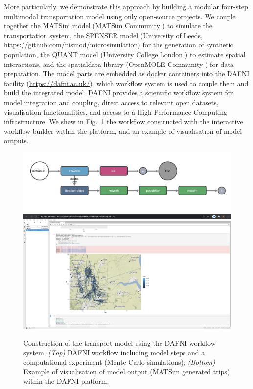 \documentclass[3p,times,procedia]{elsarticle}
\begin{document}
More particularly, we demonstrate this approach by building a modular four-step multimodal transportation model using only open-source projects. We couple together the MATSim model (MATSim Community \citep{horni2016multi}) to simulate the transportation system, the SPENSER model (University of Leeds, \url{https://github.com/nismod/microsimulation}) for the generation of synthetic population, the QUANT model (University College London \citep{milton2019accelerating}) to estimate spatial interactions, and the spatialdata library (OpenMOLE Community \citep{raimbault2020scala}) for data preparation. The model parts are embedded as docker containers into the DAFNI facility (\url{https://dafni.ac.uk/}), which workflow system is used to couple them and build the integrated model. DAFNI provides a scientific workflow system for model integration and coupling, direct access to relevant open datasets, visualisation functionalities, and access to a High Performance Computing infrastructure. We show in Fig.~\ref{fig:fig1} the workflow constructed with the interactive workflow builder within the platform, and an example of visualisation of model outputs.


\begin{figure}[t]\vspace*{4pt}
\begin{center}
\includegraphics[width=0.7\linewidth]{figures/matsim-iterations_workflow.png}\\
\includegraphics[width=0.7\linewidth]{figures/visu-trips-Leeds.png}	
\end{center}
\caption{Construction of the transport model using the DAFNI workflow system. \textit{(Top)} DAFNI workflow including model steps and a computational experiment (Monte Carlo simulations); \textit{(Bottom)} Example of visualisation of model output (MATSim generated trips) within the DAFNI platform.\label{fig:fig1}}
\end{figure}
\end{document}
